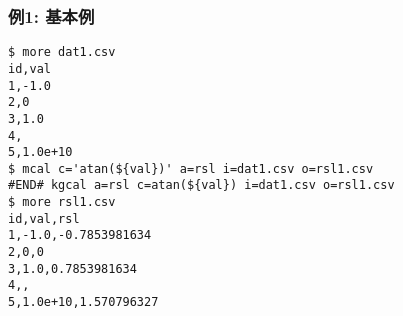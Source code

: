 \subsubsection*{例1: 基本例}



\begin{Verbatim}[baselinestretch=0.7,frame=single]
$ more dat1.csv
id,val
1,-1.0
2,0
3,1.0
4,
5,1.0e+10
$ mcal c='atan(${val})' a=rsl i=dat1.csv o=rsl1.csv
#END# kgcal a=rsl c=atan(${val}) i=dat1.csv o=rsl1.csv
$ more rsl1.csv
id,val,rsl
1,-1.0,-0.7853981634
2,0,0
3,1.0,0.7853981634
4,,
5,1.0e+10,1.570796327
\end{Verbatim}
